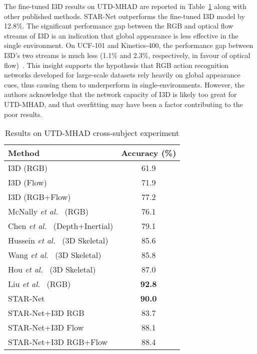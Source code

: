 \documentclass[10pt, conference, compsocconf]{IEEEtran}
\begin{document}
The fine-tuned I3D results on UTD-MHAD are reported in Table~\ref{tab:utd_soa} along with other published methods. STAR-Net outperforms the fine-tuned I3D model by 12.8\%. The significant performance gap between the RGB and optical flow streams of I3D is an indication that global appearance is less effective in the single environment. On UCF-101 and Kinetics-400, the performance gap between I3D's two streams is much less (1.1\% and 2.3\%, respectively, in favour of optical flow)~\cite{carreira2017quo}. This insight supports the hypothesis that RGB action recognition networks developed for large-scale datasets rely heavily on global appearance cues, thus causing them to underperform in single-environments. However, the authors acknowledge that the network capacity of I3D is likely too great for UTD-MHAD, and that overfitting may have been a factor contributing to the poor results. 

\begin{table}
\caption{Results on UTD-MHAD cross-subject experiment}
\vspace{-10pt}
\begin{center}
\begin{tabular}{|l|c|}
\hline
Method & Accuracy (\%) \\
\hline\hline
I3D (RGB) & 61.9\\
I3D (Flow) & 71.9\\
I3D (RGB+Flow) & 77.2\\
\hline 
McNally \textit{et al.}~\cite{mcnally2018cvis} (RGB) & 76.1\\
Chen \textit{et al.}~\cite{chen2016fusion} (Depth+Inertial) & 79.1\\
Hussein \textit{et al.}~\cite{hussein2013human} (3D Skeletal) & 85.6\\
Wang \textit{et al.}~\cite{wang2016action} (3D Skeletal) & 85.8\\
Hou \textit{et al.}~\cite{hou2018skeleton} (3D Skeletal) & 87.0\\
Liu \textit{et al.}~\cite{liu2018recognizing} (RGB) & \textbf{92.8}\\
\hline 
STAR-Net & \textbf{90.0}\\
STAR-Net+I3D RGB & 83.7\\
STAR-Net+I3D Flow & 88.1\\
STAR-Net+I3D RGB+Flow & 88.4\\
\hline
\end{tabular}
\end{center}
\label{tab:utd_soa}
\vspace{-20pt}
\end{table}
\end{document}
